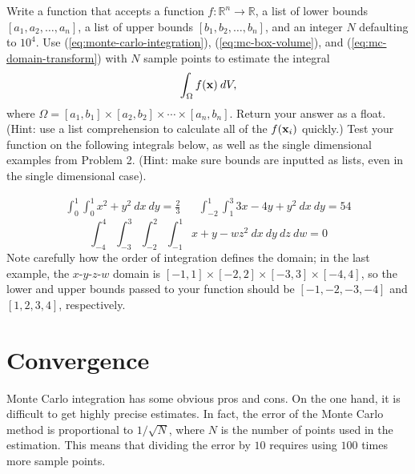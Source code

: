 \begin{problem}
Write a function that accepts a function $f:\mathbb{R}^n\rightarrow\mathbb{R}$, a list of lower bounds $[a_1, a_2, \ldots, a_n]$, a list of upper bounds $[b_1, b_2, \ldots, b_n]$, and an integer $N$ defaulting to $10^4$.
Use (\ref{eq:monte-carlo-integration}), (\ref{eq:mc-box-volume}), and (\ref{eq:mc-domain-transform}) with $N$ sample points to estimate the integral
\begin{equation*}
    \int_\Omega f(\mathbf{x})\:dV,
\end{equation*}
where $\Omega = [a_1,b_1]\times[a_2,b_2]\times\cdots\times[a_n,b_n]$. Return your answer as a float.
\\(Hint: use a list comprehension to calculate all of the $f(\mathbf{x}_i)$ quickly.)
\newline
\newline Test your function on the following integrals below, as well as the single dimensional examples from Problem 2.
\newline (Hint: make sure bounds are inputted as lists, even in the single dimensional case).

\begin{equation*}
    \begin{array}{ccc}
    \displaystyle\int_0^1\int_0^1 x^2 + y^2\:dx\:dy = \frac{2}{3}
    & &
    \displaystyle\int_{-2}^1\int_1^3 3x - 4y + y^2\:dx\:dy = 54
    \end{array}
\end{equation*}
\begin{equation*}
    \int_{-4}^4\int_{-3}^3\int_{-2}^2\int_{-1}^1 x + y - w z^2\:dx\:dy\:dz\:dw = 0
\end{equation*}
Note carefully how the order of integration defines the domain; in the last example, the $x$-$y$-$z$-$w$ domain is $[-1,1]\times[-2,2]\times[-3,3]\times[-4,4]$, so the lower and upper bounds passed to your function should be $[-1, -2, -3, -4]$ and $[1, 2, 3, 4]$, respectively.
\label{prob:montecarlo-integration-nd}
\end{problem}

\section*{Convergence} %

Monte Carlo integration has some obvious pros and cons.
On the one hand, it is difficult to get highly precise estimates.
In fact, the error of the Monte Carlo method is proportional to $1/\sqrt{N}$, where $N$ is the number of points used in the estimation.
This means that dividing the error by $10$ requires using $100$ times more sample points.

